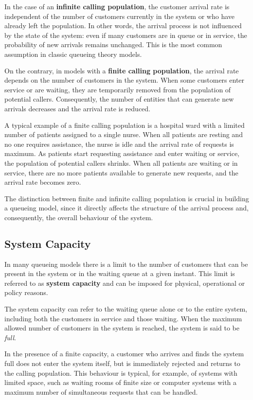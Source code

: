 In the case of an \textbf{infinite calling population}, the customer arrival rate is independent of the number of customers currently in the system or who have already left the population. In other words, the arrival process is not influenced by the state of the system: even if many customers are in queue or in service, the probability of new arrivals remains unchanged. This is the most common assumption in classic queueing theory models.

On the contrary, in models with a \textbf{finite calling population}, the arrival rate depends on the number of customers in the system. When some customers enter service or are waiting, they are temporarily removed from the population of potential callers. Consequently, the number of entities that can generate new arrivals decreases and the arrival rate is reduced.

A typical example of a finite calling population is a hospital ward with a limited number of patients assigned to a single nurse. When all patients are resting and no one requires assistance, the nurse is idle and the arrival rate of requests is maximum. As patients start requesting assistance and enter waiting or service, the population of potential callers shrinks. When all patients are waiting or in service, there are no more patients available to generate new requests, and the arrival rate becomes zero.

The distinction between finite and infinite calling population is crucial in building a queueing model, since it directly affects the structure of the arrival process and, consequently, the overall behaviour of the system.

\subsection{System Capacity}

In many queueing models there is a limit to the number of customers that can be present in the system or in the waiting queue at a given instant. This limit is referred to as \textbf{system capacity} and can be imposed for physical, operational or policy reasons.

The system capacity can refer to the waiting queue alone or to the entire system, including both the customers in service and those waiting. When the maximum allowed number of customers in the system is reached, the system is said to be \emph{full}.

In the presence of a finite capacity, a customer who arrives and finds the system full does not enter the system itself, but is immediately rejected and returns to the calling population. This behaviour is typical, for example, of systems with limited space, such as waiting rooms of finite size or computer systems with a maximum number of simultaneous requests that can be handled.

